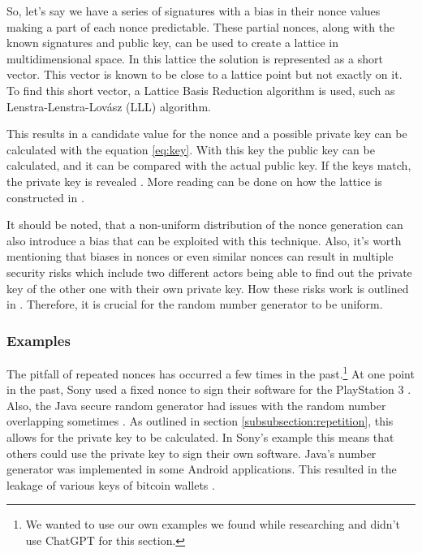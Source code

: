 So, let's say we have a series of signatures with a bias in their nonce values making a part of each nonce predictable. These partial nonces, along with the known signatures and public key, can be used to create a lattice in multidimensional space. In this lattice the solution is represented as a short vector. This vector is known to be close to a lattice point but not exactly on it. To find this short vector, a Lattice Basis Reduction algorithm is used, such as Lenstra-Lenstra-Lovász (LLL) algorithm. \cite{cryptoeprint:2019/023, cryptoeprint:2020/1506}

This results in a candidate value for the nonce and a possible private key can be calculated with the equation \ref{eq:key}. With this key the public key can be calculated, and it can be compared with the actual public key. If the keys match, the private key is revealed \cite{cryptoeprint:2019/023}. More reading can be done on how the lattice is constructed in \cite{cryptoeprint:2020/1506}.

It should be noted, that a non-uniform distribution of the nonce generation can also introduce a bias that can be exploited with this technique. Also, it's worth mentioning that biases in nonces or even similar nonces can result in multiple security risks which include two different actors being able to find out the private key of the other one with their own private key. How these risks work is outlined in \cite{cryptoeprint:2014/848}. Therefore, it is crucial for the random number generator to be uniform.

\subsubsection{Examples}
The pitfall of repeated nonces has occurred a few times in the past.\footnote{We wanted to use our own examples we found while researching and didn't use ChatGPT for this section.} At one point in the past, Sony used a fixed nonce to sign their software for the PlayStation 3 \cite{cryptoeprint:2020/728}. Also, the Java secure random generator had issues with the random number overlapping sometimes \cite{cryptoeprint:2017/1014}. As outlined in section \ref{subsubsection:repetition}, this allows for the private key to be calculated. In Sony's example this means that others could use the private key to sign their own software. Java's number generator was implemented in some Android applications. This resulted in the leakage of various keys of bitcoin wallets \cite{cryptoeprint:2014/848}.


